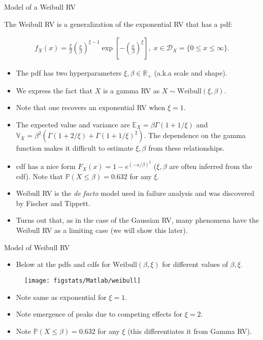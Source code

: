\documentclass[9pt]{beamer}
\begin{document}
%
\begin{frame}{Model of a Weibull RV}

The Weibull RV is a generalization of the exponential RV that has a pdf:
\begin{block}{}
\begin{align*}
f_X(x)=\frac{\xi}{\beta}\left(\frac{x}{\beta}\right)^{\xi-1}\exp\left[{-\left(\frac{x}{\beta}\right)^\xi}\right],\; x\in \mathcal{D}_X=\{0\leq x\leq \infty\}.
\end{align*}
\end{block}
\begin{itemize}
\item The pdf has two hyperparameters $\xi,\beta\in \mathbb{R}_+$ (a.k.a scale and shape).
\item We express the fact that $X$ is a gamma RV as $X\sim \textrm{Weibull}(\xi,\beta)$.
\item Note that one recovers an exponential RV when $\xi=1$. 
\item The expected value and variance are $\mathbb{E}_X=\beta\Gamma(1+1/\xi)$ and $\mathbb{V}_X=\beta^2\left(\Gamma(1+2/\xi)+\Gamma(1+1/\xi)^2\right)$. The dependence on the gamma function makes it difficult to estimate $\xi,\beta$ from these relationships. 
\item cdf has a nice form $F_X(x)=1-e^{(-x/\beta)^\xi}$ ($\xi,\beta$ are often inferred from the cdf). Note that $\mathbb{P}(X\leq \beta)=0.632$ for any $\xi$. 
\item Weibull RV is the {\em de facto} model used in failure analysis and was discovered by Fischer and Tippett. 
\item Turns out that, as in the case of the Gaussian RV, many phenomena have the Weibull RV as a limiting case (we will show this later). 
\end{itemize}

\end{frame}

%
\begin{frame}{Model of Weibull RV}
\begin{itemize}
\item Below at the pdfs and cdfs for $\textrm{Weibull}(\beta,\xi)$ for different values of $\beta,\xi$.
\end{itemize}
\begin{figure}[!htb]
    \centering
	\texttt{[image: figstats/Matlab/weibull]}
\end{figure}
\begin{itemize}
\item Note same as exponential for $\xi=1$.
\item Note emergence of peaks due to competing effects for $\xi=2$. 
\item Note $\mathbb{P}(X\leq \beta)=0.632$ for any $\xi$ (this differentiates it from Gamma RV).
\end{itemize}
\end{frame}
\end{document}
